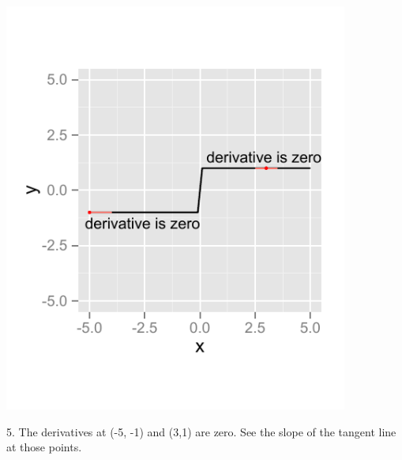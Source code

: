 \documentclass[a4paper]{report}
\begin{document}
\begin{Answer}[ref=ex0]
\begin{minipage}{\rat\textwidth}
\includegraphics[width=0.85\textwidth]{1af.pdf}
\end{minipage}
\begin{minipage}{\rati\textwidth}
5. The derivatives at (-5, -1) and (3,1) are zero. See the slope of the tangent line at those points.
\end{minipage}



\end{Answer}
\end{document}
